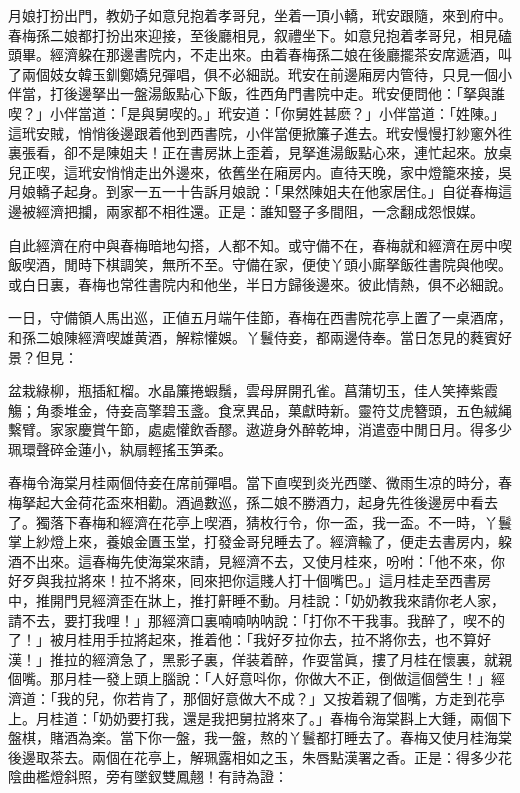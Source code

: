 月娘打扮出門，教奶子如意兒抱着孝哥兒，坐着一頂小轎，玳安跟隨，來到府中。春梅孫二娘都打扮出來迎接，至後廳相見，叙禮坐下。如意兒抱着孝哥兒，相見磕頭畢。經濟躱在那邊書院内，不走出來。由着春梅孫二娘在後廳擺茶安席遞酒，叫了兩個妓女韓玉釧鄭嬌兒彈唱，俱不必細説。玳安在前邊廂房内管待，只見一個小伴當，打後邊拏出一盤湯飯點心下飯，徃西角門書院中走。玳安便問他：「拏與誰喫？」小伴當道：「是與舅喫的。」玳安道：「你舅姓甚麽？」小伴當道：「姓陳。」這玳安賊，悄悄後邊跟着他到西書院，小伴當便掀簾子進去。玳安慢慢打紗窻外徃裏張看，卻不是陳姐夫！正在書房牀上歪着，見拏進湯飯點心來，連忙起來。放桌兒正喫，這玳安悄悄走出外邊來，依舊坐在廂房内。直待天晚，家中燈籠來接，吳月娘轎子起身。到家一五一十告訴月娘說：「果然陳姐夫在他家居住。」自従春梅這邊被經濟把攔，兩家都不相徃還。正是：誰知豎子多間阻，一念翻成怨恨媒。

自此經濟在府中與春梅暗地勾搭，人都不知。或守備不在，春梅就和經濟在房中喫飯喫酒，閒時下棋調笑，無所不至。守備在家，便使丫頭小廝拏飯徃書院與他喫。或白日裏，春梅也常徃書院内和他坐，半日方歸後邊來。彼此情熱，俱不必細說。

一日，守備領人馬出巡，正値五月端午佳節，春梅在西書院花亭上置了一桌酒席，和孫二娘陳經濟喫雄黄酒，解粽懽娛。丫鬟侍妾，都兩邊侍奉。當日怎見的蕤賓好景？但見：

\begin{myquote}
盆栽綠柳，瓶插紅榴。水晶簾捲蝦鬚，雲母屏開孔雀。菖蒲切玉，佳人笑捧紫霞觴；角黍堆金，侍妾高擎碧玉盞。食烹異品，菓獻時新。靈符艾虎簪頭，五色絨䋲繫臂。家家慶賞午節，處處懽飲香醪。遨遊身外醉乾坤，消遣壺中閒日月。得多少珮環聲碎金蓮小，紈扇輕搖玉笋柔。
\end{myquote}

春梅令海棠月桂兩個侍妾在席前彈唱。當下直喫到炎光西墜、微雨生凉的時分，春梅拏起大金荷花盃來相勸。酒過數巡，孫二娘不勝酒力，起身先徃後邊房中看去了。獨落下春梅和經濟在花亭上喫酒，猜枚行令，你一盃，我一盃。不一時，丫鬟掌上紗燈上來，養娘金匱玉堂，打發金哥兒睡去了。經濟輸了，便走去書房内，躱酒不出來。這春梅先使海棠來請，見經濟不去，又使月桂來，吩咐：「他不來，你好歹與我拉將來！拉不將來，囘來把你這賤人打十個嘴巴。」這月桂走至西書房中，推開門見經濟歪在牀上，推打鼾睡不動。月桂說：「奶奶教我來請你老人家，請不去，要打我哩！」那經濟口裏喃喃呐呐說：「打你不干我事。我醉了，喫不的了！」被月桂用手拉將起來，推着他：「我好歹拉你去，拉不將你去，也不算好漢！」推拉的經濟急了，黑影子裏，佯装着醉，作耍當眞，摟了月桂在懷裏，就親個嘴。那月桂一發上頭上腦說：「人好意呌你，你做大不正，倒做這個營生！」經濟道：「我的兒，你若肯了，那個好意做大不成？」又按着親了個嘴，方走到花亭上。月桂道：「奶奶要打我，還是我把舅拉將來了。」春梅令海棠斟上大鍾，兩個下盤棋，賭酒為楽。當下你一盤，我一盤，熬的丫鬟都打睡去了。春梅又使月桂海棠後邊取茶去。兩個在花亭上，解珮露相如之玉，朱唇點漢署之香。正是：得多少花陰曲檻燈斜照，旁有墜釵雙鳳翹！有詩為證：


